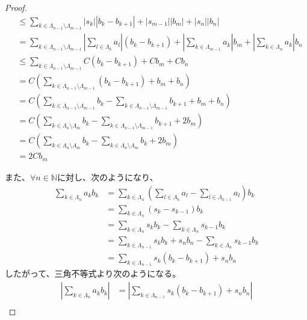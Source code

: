 \documentclass[dvipdfmx]{jsarticle}
\begin{document}
\begin{proof}
\begin{align*}
&\leq \sum_{k \in \varLambda_{n - 1} \setminus \varLambda_{m - 1}} {\left| s_{k} \right|\left| b_{k} - b_{k + 1} \right|} + \left| s_{m - 1} \right|\left| b_{m} \right| + \left| s_{n} \right|\left| b_{n} \right|\\
&= \sum_{k \in \varLambda_{n - 1} \setminus \varLambda_{m - 1}} {\left| \sum_{l \in \varLambda_{k}} a_{l} \right|\left( b_{k} - b_{k + 1} \right)} + \left| \sum_{k \in \varLambda_{m - 1}} a_{k} \right|b_{m} + \left| \sum_{k \in \varLambda_{n}} a_{k} \right|b_{n}\\
&\leq \sum_{k \in \varLambda_{n - 1} \setminus \varLambda_{m - 1}} {C\left( b_{k} - b_{k + 1} \right)} + Cb_{m} + Cb_{n}\\
&= C\left( \sum_{k \in \varLambda_{n - 1} \setminus \varLambda_{m - 1}} \left( b_{k} - b_{k + 1} \right) + b_{m} + b_{n} \right)\\
&= C\left( \sum_{k \in \varLambda_{n - 1} \setminus \varLambda_{m - 1}} b_{k} - \sum_{k \in \varLambda_{n - 1} \setminus \varLambda_{m - 1}} b_{k + 1} + b_{m} + b_{n} \right)\\
&= C\left( \sum_{k \in \varLambda_{n} \setminus \varLambda_{m}} b_{k} - \sum_{k \in \varLambda_{n - 1} \setminus \varLambda_{m - 1}} b_{k + 1} + 2b_{m} \right)\\
&= C\left( \sum_{k \in \varLambda_{n} \setminus \varLambda_{m}} b_{k} - \sum_{k \in \varLambda_{n} \setminus \varLambda_{m}} b_{k} + 2b_{m} \right)\\
&= 2Cb_{m}
\end{align*}\par
また、$\forall n \in \mathbb{N}$に対し、次のようになり、
\begin{align*}
\sum_{k \in \varLambda_{n}} {a_{k}b_{k}} &= \sum_{k \in \varLambda_{n}} {\left( \sum_{l \in \varLambda_{k}} a_{l} - \sum_{l \in \varLambda_{k - 1}} a_{l} \right)b_{k}}\\
&= \sum_{k \in \varLambda_{n}} {\left( s_{k} - s_{k - 1} \right)b_{k}}\\
&= \sum_{k \in \varLambda_{n}} {s_{k}b_{k}} - \sum_{k \in \varLambda_{n}} {s_{k - 1}b_{k}}\\
&= \sum_{k \in \varLambda_{n - 1}} {s_{k}b_{k}} + s_{n}b_{n} - \sum_{k \in \varLambda_{n}} {s_{k - 1}b_{k}}\\
&= \sum_{k \in \varLambda_{n - 1}} {s_{k}\left( b_{k} - b_{k + 1} \right)} + s_{n}b_{n}
\end{align*}
したがって、三角不等式より次のようになる。
\begin{align*}
\left| \sum_{k \in \varLambda_{n}} {a_{k}b_{k}} \right| &= \left| \sum_{k \in \varLambda_{n - 1}} {s_{k}\left( b_{k} - b_{k + 1} \right)} + s_{n}b_{n} \right|\\

\end{align*}
\end{proof}
\end{document}
